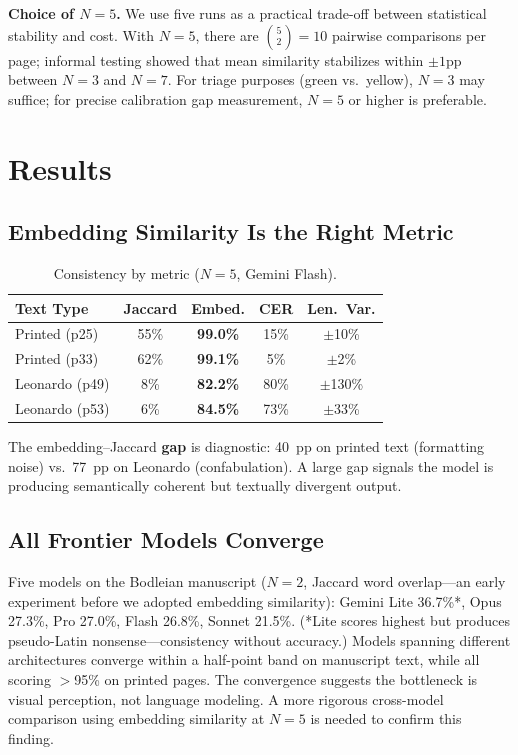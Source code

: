 \documentclass[10pt,twocolumn]{article}
\begin{document}
\textbf{Choice of $N{=}5$.} We use five runs as a practical trade-off between statistical stability and cost. With $N{=}5$, there are $\binom{5}{2}{=}10$ pairwise comparisons per page; informal testing showed that mean similarity stabilizes within ${\pm}1$pp between $N{=}3$ and $N{=}7$. For triage purposes (green vs.\ yellow), $N{=}3$ may suffice; for precise calibration gap measurement, $N{=}5$ or higher is preferable.

\section{Results}

\subsection{Embedding Similarity Is the Right Metric}

\begin{table}[H]
\small
\centering
\caption{Consistency by metric ($N{=}5$, Gemini Flash).}
\label{tab:metrics}
\begin{tabular}{@{}lcccc@{}}
\toprule
Text Type & Jaccard & Embed. & CER & Len.\ Var. \\
\midrule
Printed (p25) & 55\% & \textbf{99.0\%} & 15\% & $\pm$10\% \\
Printed (p33) & 62\% & \textbf{99.1\%} & 5\% & $\pm$2\% \\
Leonardo (p49) & 8\% & \textbf{82.2\%} & 80\% & $\pm$130\% \\
Leonardo (p53) & 6\% & \textbf{84.5\%} & 73\% & $\pm$33\% \\
\bottomrule
\end{tabular}
\end{table}

The embedding--Jaccard \textbf{gap} is diagnostic: 40~pp on printed text (formatting noise) vs.\ 77~pp on Leonardo (confabulation). A large gap signals the model is producing semantically coherent but textually divergent output.

\subsection{All Frontier Models Converge}

Five models on the Bodleian manuscript ($N{=}2$, Jaccard word overlap---an early experiment before we adopted embedding similarity): Gemini Lite 36.7\%*, Opus 27.3\%, Pro 27.0\%, Flash 26.8\%, Sonnet 21.5\%. (*Lite scores highest but produces pseudo-Latin nonsense---consistency without accuracy.) Models spanning different architectures converge within a half-point band on manuscript text, while all scoring $>$95\% on printed pages. The convergence suggests the bottleneck is visual perception, not language modeling. A more rigorous cross-model comparison using embedding similarity at $N{=}5$ is needed to confirm this finding.
\end{document}
